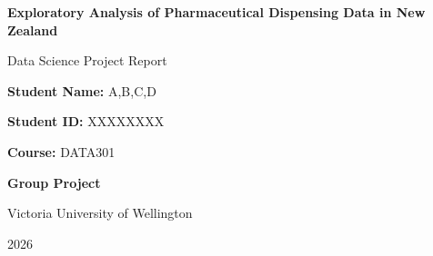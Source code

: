 \documentclass[11pt,a4paper]{report}
\begin{document}

\begin{titlepage}

\centering

\vspace*{2cm}

{\Huge \textbf{Exploratory Analysis of Pharmaceutical Dispensing Data in New Zealand}\par}

\vspace{1.5cm}

{\Large Data Science Project Report\par}

\vspace{2cm}

{\large
\textbf{Student Name:} A,B,C,D
\par}

\vspace{0.5cm}

{\large
\textbf{Student ID:} XXXXXXXX
\par}

\vspace{1cm}

{\large
\textbf{Course:} DATA301
\par}

\vspace{0.5cm}

{\large
\textbf{Group Project}
\par}

\vfill

{\large
Victoria University of Wellington
\par}

\vspace{0.5cm}

{\large
2026
\par}

\end{titlepage}



\tableofcontents

\clearpage


\end{document}
